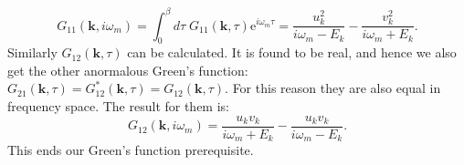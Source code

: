 \begin{equation}
G_{11}(\mathbf{k},i\omega_m) = \int_0^\beta d\tau \; G_{11}(\mathbf{k},\tau) \text{e}^{i\omega_m\tau} = \frac{u_k^2}{i\omega_m-E_k}-\frac{v_k^2}{i\omega_m+E_k}. 
\end{equation}
Similarly $G_{12}(\mathbf{k},\tau)$ can be calculated. It is found to be real, and hence we also get the other anormalous Green's function: $G_{21}(\mathbf{k},\tau)=G_{12}^*(\mathbf{k},\tau)=G_{12}(\mathbf{k},\tau)$. For this reason they are also equal in frequency space. The result for them is:
\begin{equation}
G_{12}(\mathbf{k},i\omega_m)= \frac{u_kv_k}{i\omega_m+E_k}-\frac{u_kv_k}{i\omega_m-E_k}. 
\end{equation}
This ends our Green's function prerequisite.